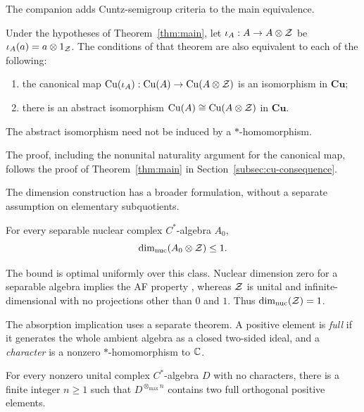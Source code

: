 The companion \cite[Corollaries~1.3 and~1.4]{CuntzCompanion} adds
Cuntz-semigroup criteria to the main equivalence.

\begin{corollary}
\label{cor:regularity-cu}
Under the hypotheses of Theorem~\ref{thm:main}, let
$\iota_A:A\to A\otimes\mathcal Z$ be $\iota_A(a)=a\otimes1_\mathcal Z$.
The conditions of that theorem are also equivalent to each of the following:
\begin{enumerate}[label=\textup{(\roman*)}]
\item the canonical map $\mathrm{Cu}(\iota_A):\mathrm{Cu}(A)\to\mathrm{Cu}(A\otimes\mathcal Z)$ is
an isomorphism in $\mathbf{Cu}$;
\item there is an abstract isomorphism $\mathrm{Cu}(A)\cong\mathrm{Cu}(A\otimes\mathcal Z)$
in $\mathbf{Cu}$.
\end{enumerate}
The abstract isomorphism need not be induced by a $*$-homomorphism.
\end{corollary}

The proof, including the nonunital naturality argument for the canonical
map, follows the proof of Theorem~\ref{thm:main} in
Section~\ref{subsec:cu-consequence}.

The dimension construction has a broader formulation, without a
separate assumption on elementary subquotients.

\begin{theorem}
\label{intro:main}
For every separable nuclear complex $C^*$-algebra $A_0$,
\[
 \dim_{\mathrm{nuc}}(A_0\otimes\mathcal Z)\le1.
\]
\end{theorem}

The bound is optimal uniformly over this class. Nuclear dimension zero
for a separable algebra implies the AF property
\cite[Remarks~2.2(iii)]{WZNuclear}, whereas $\mathcal Z$ is unital and
infinite-dimensional with no projections other than $0$ and $1$.
Thus $\dim_{\mathrm{nuc}}(\mathcal Z)=1$.

The absorption implication uses a separate theorem. A positive element
is \emph{full} if it generates the whole ambient algebra as a closed
two-sided ideal, and a \emph{character} is a nonzero $*$-homomorphism
to $\mathbb C$.

\begin{theorem}
\label{thm:tensor-intro}
For every nonzero unital complex $C^*$-algebra $D$ with no characters,
there is a finite integer $n\ge1$ such that
$D^{\otimes_{\max}n}$ contains two full orthogonal positive elements.
\end{theorem}

